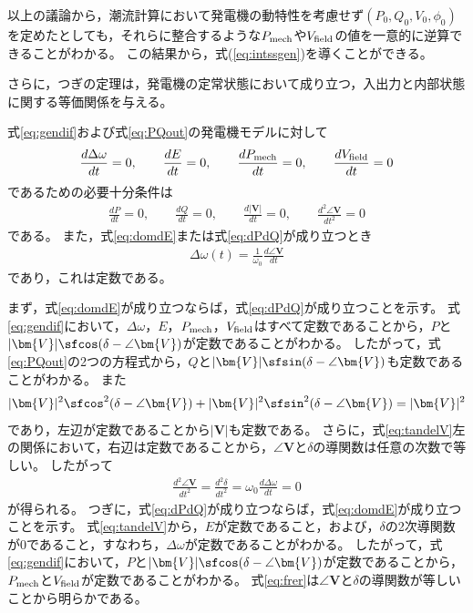 \documentclass[tombow,dvipdfmx]{corona-a5}
\begin{document}
以上の議論から，潮流計算において発電機の動特性を考慮せず$(P_0,Q_0,V_0,\phi_0)$を定めたとしても，それらに整合するような$P_{\rm mech}$や$V_{\rm field}$の値を一意的に逆算できることがわかる。
この結果から，式(\ref{eq:intssgen})を導くことができる。

さらに，つぎの定理は，発電機の定常状態において成り立つ，入出力と内部状態に関する等価関係を与える。

\begin{定理}[発電機の入出力と内部状態に関する等価関係]
\label{thm:outst}
式\ref{eq:gendif}および式\ref{eq:PQout}の発電機モデルに対して
\begin{align}\label{eq:domdE}
\frac{d\Delta \omega}{dt}=0
,\qquad
\frac{dE}{dt}=0
,\qquad
\frac{d P_{\rm mech}}{dt}=0
,\qquad
\frac{d V_{\rm field}}{dt}=0
\end{align}
であるための必要十分条件は
\begin{align}\label{eq:dPdQ}
\frac{dP}{dt}=0
,\qquad
\frac{dQ}{dt}=0
,\qquad
\frac{d|\bm{V}|}{dt}=0
,\qquad
\frac{d^2 \angle \bm{V}}{dt^2}=0
\end{align}
である。
また，式\ref{eq:domdE}または式\ref{eq:dPdQ}が成り立つとき
\begin{align}\label{eq:frer}
\Delta \omega(t)= \frac{1}{\omega_0}\frac{d \angle \bm{V}}{dt}
\end{align}
であり，これは定数である。
\end{定理}

\begin{証明}
まず，式\ref{eq:domdE}が成り立つならば，式\ref{eq:dPdQ}が成り立つことを示す。
式\ref{eq:gendif}において，$\Delta \omega$，$E$，$P_{\rm mech}$，$V_{\rm field}$はすべて定数であることから，$P$と$|\bm{V}|\sfcos (\delta - \angle \bm{V})$が定数であることがわかる。
したがって，式\ref{eq:PQout}の2つの方程式から，$Q$と$|\bm{V}|\sfsin (\delta - \angle \bm{V})$も定数であることがわかる。
また
\begin{align*}
|\bm{V}|^2\sfcos^2 (\delta - \angle \bm{V}) +
|\bm{V}|^2\sfsin^2 (\delta - \angle \bm{V}) = |\bm{V}|^2
\end{align*}
であり，左辺が定数であることから$|\bm{V}|$も定数である。
さらに，式\ref{eq:tandelV}左の関係において，右辺は定数であることから，$\angle \bm{V}$と$\delta$の導関数は任意の次数で等しい。
したがって
\begin{align*}
\frac{d^2 \angle \bm{V}}{dt^2} = \frac{d^2 \delta}{dt^2} = \omega_0 \frac{d\Delta \omega}{dt} =0
\end{align*}
が得られる。
つぎに，式\ref{eq:dPdQ}が成り立つならば，式\ref{eq:domdE}が成り立つことを示す。
式\ref{eq:tandelV}から，$E$が定数であること，および，$\delta$の2次導関数が$0$であること，すなわち，$\Delta \omega$が定数であることがわかる。
したがって，式\ref{eq:gendif}において，$P$と$|\bm{V}|\sfcos (\delta - \angle \bm{V})$が定数であることから，$P_{\rm mech}$と$V_{\rm field}$が定数であることがわかる。
式\ref{eq:frer}は$\angle \bm{V}$と$\delta$の導関数が等しいことから明らかである。
\end{証明}
\end{document}
